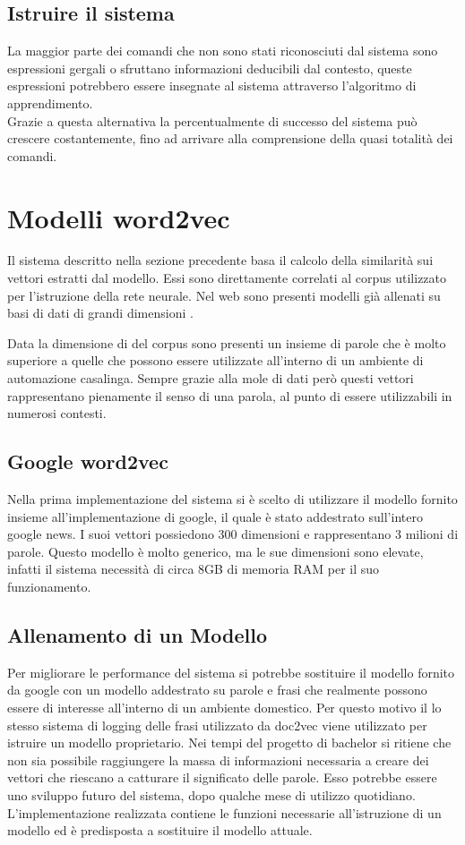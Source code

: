 \documentclass[twoside]{supsistudent}
\begin{document}
\section{Istruire il sistema}
La maggior parte dei comandi che non sono stati riconosciuti dal sistema sono espressioni gergali o sfruttano informazioni deducibili dal contesto, queste espressioni potrebbero essere insegnate al sistema attraverso l'algoritmo di apprendimento. \\
Grazie a questa alternativa la percentualmente di successo del sistema può crescere costantemente, fino ad arrivare alla comprensione della quasi totalità dei comandi.
\chapter{Modelli word2vec}
Il sistema descritto nella sezione precedente basa il calcolo della similarità sui vettori estratti dal modello. Essi sono direttamente correlati al corpus \cite{corpus} utilizzato per l'istruzione della rete neurale. Nel web sono presenti modelli già allenati su basi di dati di grandi dimensioni \cite{trained_models}.

Data la dimensione di del corpus sono presenti un insieme di parole che è molto superiore a quelle che possono essere utilizzate all'interno di un ambiente di automazione casalinga. Sempre grazie alla mole di dati però questi vettori rappresentano pienamente il senso di una parola, al punto di essere utilizzabili in numerosi contesti.
\section{Google word2vec}
Nella prima implementazione del sistema si è scelto di utilizzare il modello fornito insieme all'implementazione di google, il quale è stato addestrato sull'intero google news. I suoi vettori possiedono 300 dimensioni e rappresentano 3 milioni di parole. Questo modello è molto generico, ma le sue dimensioni sono elevate, infatti il sistema necessità di circa 8GB di memoria RAM per il suo funzionamento.
\section{Allenamento di un Modello}
Per migliorare le performance del sistema si potrebbe sostituire il modello fornito da google con un modello addestrato su parole e frasi che realmente possono essere di interesse all'interno di un ambiente domestico. Per questo motivo il lo stesso sistema di logging delle frasi utilizzato da doc2vec viene utilizzato per istruire un modello proprietario. Nei tempi del progetto di bachelor si ritiene che non sia possibile raggiungere la massa di informazioni necessaria a creare dei vettori che riescano a catturare il significato delle parole. Esso potrebbe essere uno sviluppo futuro del sistema, dopo qualche mese di utilizzo quotidiano. L'implementazione realizzata contiene le funzioni necessarie all'istruzione di un modello ed è predisposta a sostituire il modello attuale.
\end{document}
